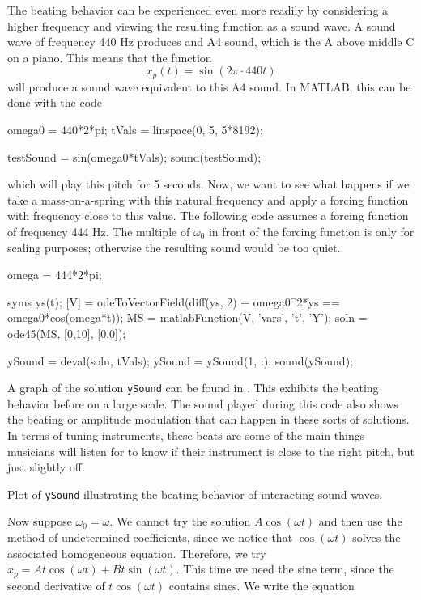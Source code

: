 \documentclass{ximera}
\begin{document}
The beating behavior can be experienced even more readily by considering a higher frequency and viewing the resulting function as a sound wave. A sound wave of frequency 440 Hz produces and A4 sound, which is the A above middle C on a piano. This means that the function
\begin{equation*}
    x_p(t) = \sin(2\pi\cdot 440 t)
\end{equation*} 
will produce a sound wave equivalent to this A4 sound. In MATLAB, this can be done with the code
\begin{code}
omega0 = 440*2*pi;
tVals = linspace(0, 5, 5*8192);

testSound = sin(omega0*tVals);
sound(testSound);
\end{code}
\noindent which will play this pitch for 5 seconds. Now, we want to see what happens if we take a mass-on-a-spring with this natural frequency and apply a forcing function with frequency close to this value. The following code assumes a forcing function of frequency 444 Hz. The multiple of $\omega_0$ in front of the forcing function is only for scaling purposes; otherwise the resulting sound would be too quiet.

\begin{code}
omega = 444*2*pi;

syms ys(t);
[V] = odeToVectorField(diff(ys, 2) + omega0^2*ys == omega0*cos(omega*t));
MS = matlabFunction(V, 'vars', {'t', 'Y'});
soln = ode45(MS, [0,10], [0,0]);

ySound = deval(soln, tVals);
ySound = ySound(1, :);
sound(ySound);
\end{code}

A graph of the solution \texttt{ySound} can be found in . This exhibits the beating behavior before on a large scale. The sound played during this code also shows the beating or amplitude modulation that can happen in these sorts of solutions. In terms of tuning instruments, these beats are some of the main things musicians will listen for to know if their instrument is close to the right pitch, but just slightly off. 

\begin{myfig}
    \capstart
    \caption{Plot of \texttt{ySound} illustrating the beating behavior of interacting sound waves. \label{beatplot:fig}}
\end{myfig}

Now suppose $\omega_0 = \omega$.  We cannot try the solution $A \cos (\omega t)$ and then use the method of undetermined coefficients, since we notice that $\cos (\omega t)$ solves the associated homogeneous equation.  Therefore, we try $x_p = A t \cos (\omega t) + B t \sin (\omega t)$.  This time we need the sine term, since the second derivative of $t \cos (\omega t)$ contains sines. We write the equation
\end{document}
